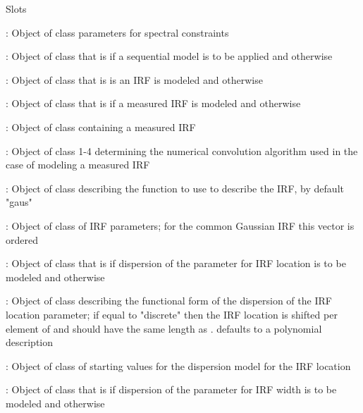 \documentclass{article}
\begin{document}
\begin{Section}{Slots}
\item[\code{specpar}:] Object of class   parameters for
spectral constraints
\item[\code{seqmod}:] Object of class   that is  if a sequential model is to be applied
and  otherwise
\item[\code{irf}:] Object of class    that is  is an IRF is modeled and  otherwise
\item[\code{mirf}:] Object of class   that is  if a measured IRF is modeled and 
otherwise
\item[\code{measured\_irf}:] Object of class   containing a measured IRF
\item[\code{convalg}:] Object of class   1-4 determining the numerical convolution algorithm 
used in the case of modeling a measured IRF
\item[\code{irffun}:] Object of class   describing the 
function to use to describe the IRF, by default "gaus"
\item[\code{irfpar}:] Object of class   of IRF parameters; for the common Gaussian IRF this 
vector is ordered 
\item[\code{dispmu}:] Object of class    that is  if dispersion of the parameter for IRF 
location is to be modeled and  otherwise
\item[\code{dispmufun}:] Object of class   describing the functional form of the 
dispersion of the IRF location parameter; if equal to "discrete" then the 
IRF location is shifted per element of  and  should have the same 
length as .  defaults to a polynomial description
\item[\code{parmu}:] Object of class    of starting values for the dispersion model for the 
IRF location
\item[\code{disptau}:] Object of class   that is  if dispersion of the parameter for 
IRF width is to be modeled and  otherwise

\end{Section}
\end{document}
